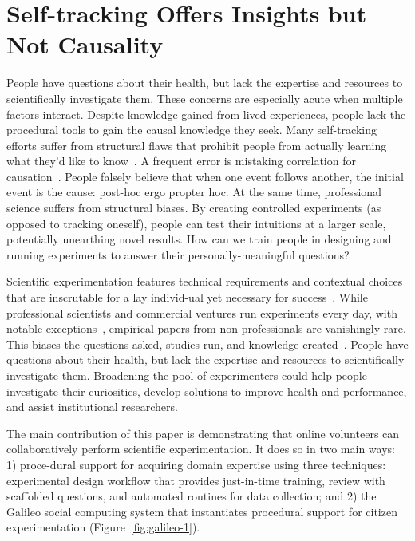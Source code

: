 \section{Self-tracking Offers Insights but Not Causality}
People have questions about their health, but lack the expertise and resources to scientifically
investigate them. These concerns are especially acute when multiple factors interact. Despite
knowledge gained from lived experiences, people lack the procedural tools to gain the causal
knowledge they seek. Many self-tracking efforts suffer from structural flaws that prohibit people
from actually learning what they’d like to know~\cite{Choe2014, Li2010a}. A frequent error is mistaking correlation
for causation~\cite{Munroe2009}. People falsely believe that when one event follows another, the initial event is
the cause: post-hoc ergo propter hoc. At the same time, professional science suffers from structural
biases. By creating controlled experiments (as opposed to tracking oneself), people can test their
intuitions at a larger scale, potentially unearthing novel results. How can we train people in designing
and running experiments to answer their personally-meaningful questions?

Scientific experimentation features technical requirements and contextual choices that are inscrutable for a lay individ-ual yet necessary for success~\cite{Martin2007}. While professional scientists and commercial ventures run experiments every day, with notable exceptions~\cite{Cooper2010, Lewis2016}, empirical papers from non-professionals are vanishingly rare. This biases the questions asked, studies run, and knowledge created~\cite{crawford2017politics,Henrich2010a}. People have questions about their health, but lack the expertise and resources to scientifically investigate them. Broadening the pool of experimenters could help people investigate their curiosities, develop solutions to improve health and performance, and assist institutional researchers.

The main contribution of this paper is demonstrating that online volunteers can collaboratively perform scientific experimentation. It does so in two main ways: 1) proce-dural support for acquiring domain expertise using three techniques: experimental design workflow that provides just-in-time training, review with scaffolded questions, and automated routines for data collection; and 2) the Galileo social computing system that instantiates procedural support for citizen experimentation (Figure~\ref{fig:galileo-1}). 

